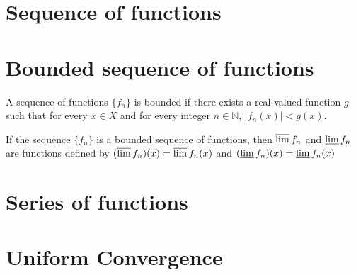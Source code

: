 \section{Sequence of functions}

\section{Bounded sequence of functions}
	\begin{definition}
		A sequence of functions $\{f_n\}$ is bounded if there exists a real-valued function $g$ such that for every $x \in X$ and for every integer $n \in \mathbb{N}$, $|f_n(x)| < g(x)$.
	\end{definition}
	\begin{definition}
		If the sequence $\{f_n\}$ is a bounded sequence of functions, then $\varlimsup f_n$ and $\varliminf f_n$ are functions defined by $(\varlimsup f_n)(x) = \varlimsup f_n(x)$ and $(\varliminf f_n)(x) = \varliminf f_n(x)$
	\end{definition}

\section{Series of functions}

\section{Uniform Convergence}
